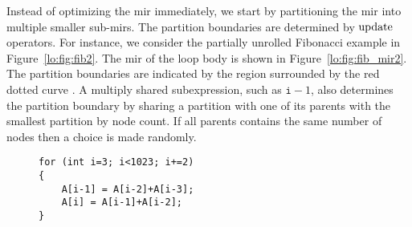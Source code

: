 Instead of optimizing the \gls{mir} immediately, we start by partitioning the
\gls{mir} into multiple smaller sub-\glspl{mir}.  The partition boundaries are
determined by $\operatorname{\mathrm{update}}$ operators.  For instance, we consider the partially
unrolled Fibonacci example in Figure~\ref{lo:fig:fib2}.  The \gls{mir} of the
loop body is shown in Figure~\ref{lo:fig:fib_mir2}.  The partition boundaries
are indicated by the region surrounded by the red dotted curve .  A multiply shared
subexpression, such as $\texttt{i} - 1$, also determines the partition boundary
by sharing a partition with one of its parents with the smallest partition by
node count.  If all parents contains the same number of nodes then a choice is
made randomly.
\begin{figure}[ht]
    \centering
    \newsavebox{\fiblstb}
    \begin{lrbox}{\fiblstb}
        \begin{lstlisting}
for (int i=3; i<1023; i+=2)
{
    A[i-1] = A[i-2]+A[i-3];
    A[i] = A[i-1]+A[i-2];
}
        \end{lstlisting}
    \end{lrbox}
\end{figure}
